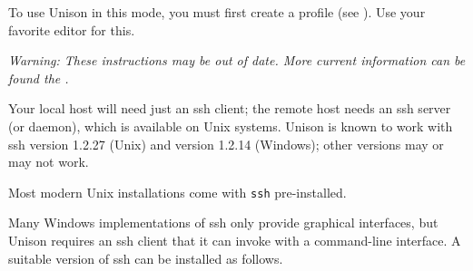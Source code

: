 \documentclass{article}
\begin{document}
To use Unison in this mode, you must first create a profile (see
).  Use your favorite editor for this.


\appendix
{}

{\em Warning: These instructions may be out of date.  More current
  information can be found the
  .}

Your local host will need just an ssh client; the remote host needs an
ssh server (or daemon), which is available on Unix systems.  Unison is
known to work with ssh version 1.2.27 (Unix) and version 1.2.14
(Windows); other versions may or may not work.


Most modern Unix installations come with \verb|ssh| pre-installed.

Many Windows implementations of ssh only provide graphical interfaces,
but Unison requires an ssh client that it can invoke with a
command-line interface.  A suitable version of ssh can be installed as
follows.
\end{document}
